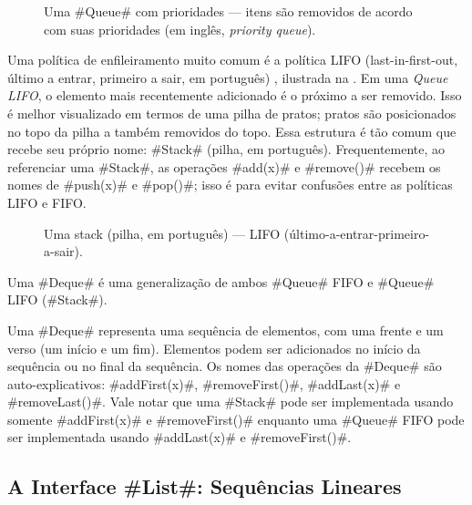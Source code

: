 \begin{figure}
  \caption[Uma fila com prioridades]{Uma #Queue# com prioridades --- itens são removidos de acordo com suas prioridades (em inglês, \emph{priority queue}).}
\end{figure}


Uma política de enfileiramento muito comum é a política LIFO (last-in-first-out, último a entrar, primeiro a sair, em português)
%
%
%
%
%
%
, ilustrada na . Em uma \emph{Queue LIFO},
o elemento mais recentemente adicionado é o próximo a ser removido. 
Isso é melhor visualizado em termos de uma pilha de pratos; pratos são 
posicionados no topo da pilha a também removidos do topo. Essa estrutura
é tão comum que recebe seu próprio nome: #Stack# (pilha, em português). Frequentemente, ao referenciar uma #Stack#, as operações #add(x)# e #remove()# 
recebem os nomes de #push(x)# e #pop()#; isso é para evitar confusões entre as políticas LIFO e FIFO.

\begin{figure}
  \caption[Uma stack]{Uma stack (pilha, em português) --- LIFO (último-a-entrar-primeiro-a-sair).}
\end{figure}


Uma #Deque#
%
é uma generalização de ambos #Queue# FIFO e #Queue# LIFO (#Stack#).

Uma #Deque# representa uma sequência de elementos, com uma frente e um verso (um início e um fim). 
Elementos podem ser adicionados no início da sequência ou no final da sequência.
Os nomes das operações da #Deque# são auto-explicativos: 
#addFirst(x)#, #removeFirst()#, #addLast(x)# e #removeLast()#.  
Vale notar que uma #Stack# pode ser implementada usando somente #addFirst(x)#
e #removeFirst()# enquanto uma #Queue# FIFO pode ser implementada usando 
#addLast(x)# e #removeFirst()#.

\subsection{A Interface #List#: Sequências Lineares}

